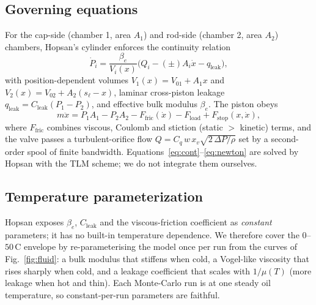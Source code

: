 \documentclass[conference]{IEEEtran}
\begin{document}
\subsection{Governing equations}
For the cap-side (chamber 1, area $A_1$) and rod-side (chamber 2, area $A_2$)
chambers, Hopsan's cylinder enforces the continuity relation
\begin{equation}
\dot{P}_i = \frac{\beta_e}{V_i(x)}\Big(Q_i - (\pm)A_i \dot{x} - q_{\text{leak}}\Big),
\label{eq:cont}
\end{equation}
with position-dependent volumes $V_1(x)=V_{01}+A_1 x$ and
$V_2(x)=V_{02}+A_2(s_\ell-x)$, laminar cross-piston leakage
$q_{\text{leak}}=C_{\text{leak}}(P_1-P_2)$, and effective bulk modulus $\beta_e$.
The piston obeys
\begin{equation}
m\ddot{x} = P_1 A_1 - P_2 A_2 - F_{\text{fric}}(\dot{x}) - F_{\text{load}}
            + F_{\text{stop}}(x,\dot{x}),
\label{eq:newton}
\end{equation}
where $F_{\text{fric}}$ combines viscous, Coulomb and stiction (static $>$
kinetic) terms, and the valve passes a turbulent-orifice flow
$Q = C_q\,w\,x_v\sqrt{2\,\Delta P/\rho}$ set by a second-order spool of finite
bandwidth. Equations~\eqref{eq:cont}--\eqref{eq:newton} are solved by Hopsan
with the TLM scheme; we do not integrate them ourselves.

\subsection{Temperature parameterization}
Hopsan exposes $\beta_e$, $C_{\text{leak}}$ and the viscous-friction coefficient
as \emph{constant} parameters; it has no built-in temperature dependence. We
therefore cover the $0$--$50\,$\textdegree C envelope by re-parameterising the
model once per run from the curves of Fig.~\ref{fig:fluid}: a bulk modulus that
stiffens when cold, a Vogel-like viscosity that rises sharply when cold, and a
leakage coefficient that scales with $1/\mu(T)$ (more leakage when hot and thin).
Each Monte-Carlo run is at one steady oil temperature, so constant-per-run
parameters are faithful.
\end{document}
